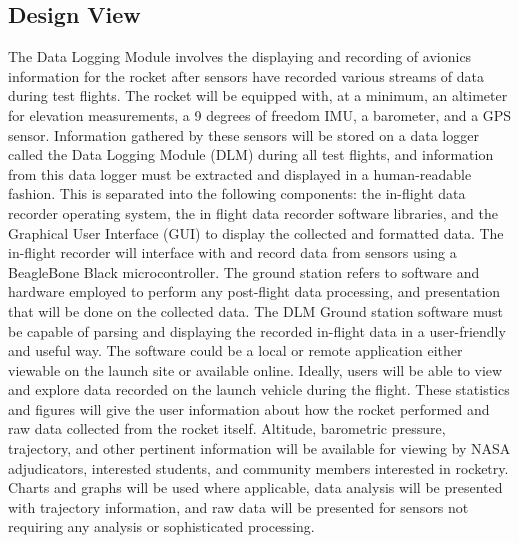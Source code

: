\documentclass[onecolumn, draftclsnofoot,10pt, compsoc]{IEEEtran}
\begin{document}
\subsection{Design View}
The Data Logging Module involves the displaying and recording of avionics information for the rocket after sensors have recorded various streams of data during test flights.
The rocket will be equipped with, at a minimum, an altimeter for elevation measurements, a 9 degrees of freedom IMU, a barometer, and a GPS sensor. Information gathered by these sensors will be stored on a data logger called the Data Logging Module (DLM) during all test flights, and information from this data logger must be extracted and displayed in a human-readable fashion. This is separated into the following components: the in-flight data recorder operating system, the in flight data recorder software libraries, and the Graphical User Interface (GUI) to display the collected and formatted data. The in-flight recorder will interface with and record data from sensors using a BeagleBone Black microcontroller. The ground station refers to software and hardware employed to perform any post-flight data processing, and presentation that will be done on the collected data.
The DLM Ground station software must be capable of parsing and displaying the recorded in-flight data in a user-friendly and useful way. The software could be a local or remote application either viewable on the launch site or available online. Ideally, users will be able to view and explore data recorded on the launch vehicle during the flight. These statistics and figures will give the user information about how the rocket performed and raw data collected from the rocket itself. Altitude, barometric pressure, trajectory, and other pertinent information will be available for viewing by NASA adjudicators, interested students, and community members interested in rocketry. Charts and graphs will be used where applicable, data analysis will be presented with trajectory information, and raw data will be presented for sensors not requiring any analysis or sophisticated processing.
\end{document}
